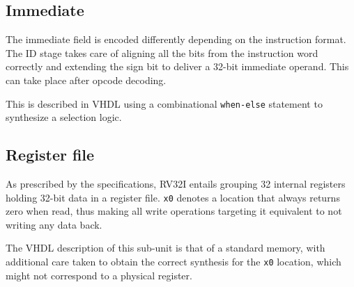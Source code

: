 \subsection{Immediate} The immediate field is encoded differently depending on the instruction format. The ID stage takes care of aligning all the bits from the instruction word correctly and extending the sign bit to deliver a 32-bit immediate operand. This can take place after opcode decoding.

This is described in VHDL using a combinational \texttt{when-else} statement to synthesize a selection logic.

\subsection{Register file} As prescribed by the specifications, RV32I entails grouping 32 internal registers holding 32-bit data in a register file. \texttt{x0} denotes a location that always returns zero when read, thus making all write operations targeting it equivalent to not writing any data back.

The VHDL description of this sub-unit is that of a standard memory, with additional care taken to obtain the correct synthesis for the \texttt{x0} location, which might not correspond to a physical register.
